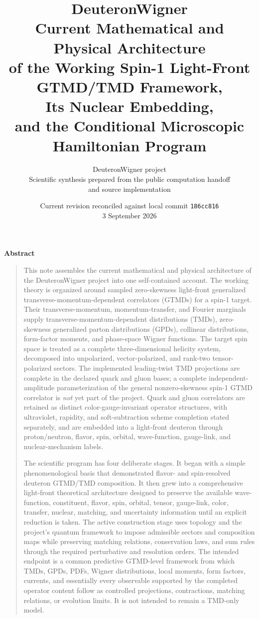 \documentclass[11pt,oneside]{book}
\title{\Huge \textbf{DeuteronWigner}\\[0.7em]
\LARGE Current Mathematical and Physical Architecture\\[0.25em]
\Large of the Working Spin-1 Light-Front GTMD/TMD Framework,\\
Its Nuclear Embedding,\\
and the Conditional Microscopic Hamiltonian Program}
\author{DeuteronWigner project\\Scientific synthesis prepared from the public computation handoff\\and source implementation}
\date{Current revision reconciled against local commit \texttt{186cc816}\\3 September 2026}
\newenvironment{abstract}{%
  \clearpage\begin{center}\Large\bfseries Abstract\end{center}\begin{quote}
}{%
  \end{quote}\clearpage
}
\begin{document}
\frontmatter
\maketitle

\begin{abstract}
This note assembles the current mathematical and physical architecture of the DeuteronWigner project into one self-contained account.  The working theory is organized around sampled zero-skewness light-front generalized transverse-momentum-dependent correlators (GTMDs) for a spin-1 target.  Their transverse-momentum, momentum-transfer, and Fourier marginals supply transverse-momentum-dependent distributions (TMDs), zero-skewness generalized parton distributions (GPDs), collinear distributions, form-factor moments, and phase-space Wigner functions.  The target spin space is treated as a complete three-dimensional helicity system, decomposed into unpolarized, vector-polarized, and rank-two tensor-polarized sectors.  The implemented leading-twist TMD projections are complete in the declared quark and gluon bases; a complete independent-amplitude parameterization of the general nonzero-skewness spin-1 GTMD correlator is \emph{not} yet part of the project.  Quark and gluon correlators are retained as distinct color-gauge-invariant operator structures, with ultraviolet, rapidity, and soft-subtraction scheme completion stated separately, and are embedded into a light-front deuteron through proton/neutron, flavor, spin, orbital, wave-function, gauge-link, and nuclear-mechanism labels.

The scientific program has four deliberate stages.  It began with a simple phenomenological basis that demonstrated flavor- and spin-resolved deuteron GTMD/TMD composition.  It then grew into a comprehensive light-front theoretical architecture designed to preserve the available wave-function, constituent, flavor, spin, orbital, tensor, gauge-link, color, transfer, nuclear, matching, and uncertainty information until an explicit reduction is taken.  The active construction stage uses topology and the project's quantum framework to impose admissible sectors and composition maps while preserving matching relations, conservation laws, and sum rules through the required perturbative and resolution orders.  The intended endpoint is a common predictive GTMD-level framework from which TMDs, GPDs, PDFs, Wigner distributions, local moments, form factors, currents, and essentially every observable supported by the completed operator content follow as controlled projections, contractions, matching relations, or evolution limits.  It is not intended to remain a TMD-only model.


\end{abstract}
\end{document}
